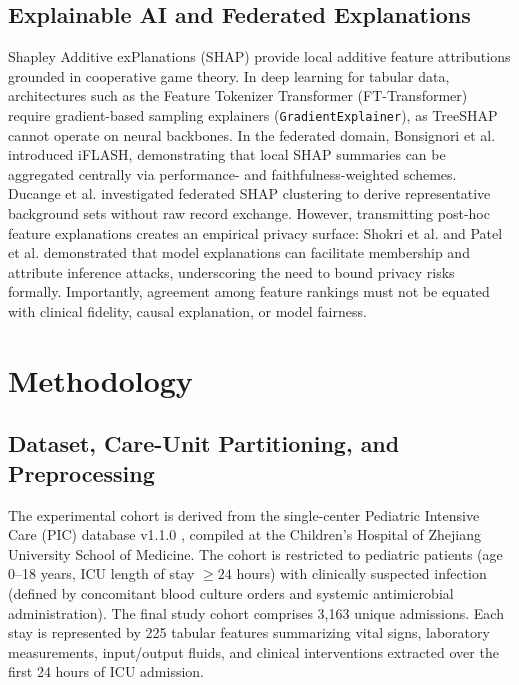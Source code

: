\documentclass[conference,a4paper]{IEEEtran}
\begin{document}
\subsection{Explainable AI and Federated Explanations}
Shapley Additive exPlanations (SHAP) \cite{lundberg2017shap} provide local additive feature attributions grounded in cooperative game theory. In deep learning for tabular data, architectures such as the Feature Tokenizer Transformer (FT-Transformer) \cite{gorishniy2021revisiting} require gradient-based sampling explainers (\texttt{GradientExplainer}), as TreeSHAP cannot operate on neural backbones. In the federated domain, Bonsignori et al. \cite{bonsignori2026interpreting} introduced iFLASH, demonstrating that local SHAP summaries can be aggregated centrally via performance- and faithfulness-weighted schemes. Ducange et al. \cite{ducange2026federated} investigated federated SHAP clustering to derive representative background sets without raw record exchange. However, transmitting post-hoc feature explanations creates an empirical privacy surface: Shokri et al. \cite{shokri2021privacy} and Patel et al. \cite{patel2022model} demonstrated that model explanations can facilitate membership and attribute inference attacks, underscoring the need to bound privacy risks formally. Importantly, agreement among feature rankings must not be equated with clinical fidelity, causal explanation, or model fairness.

\section{Methodology}\label{sec:method}

\subsection{Dataset, Care-Unit Partitioning, and Preprocessing}
The experimental cohort is derived from the single-center Pediatric Intensive Care (PIC) database v1.1.0 \cite{zeng2020pic}, compiled at the Children's Hospital of Zhejiang University School of Medicine. The cohort is restricted to pediatric patients (age 0--18 years, ICU length of stay $\ge 24$ hours) with clinically suspected infection (defined by concomitant blood culture orders and systemic antimicrobial administration). The final study cohort comprises 3,163 unique admissions. Each stay is represented by 225 tabular features summarizing vital signs, laboratory measurements, input/output fluids, and clinical interventions extracted over the first 24 hours of ICU admission.
\end{document}
